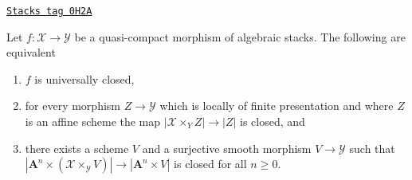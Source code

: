 \begin{lemma}
\label{stacks-limits-lemma-test-universally-closed}
\href{https://stacks.math.columbia.edu/tag/0H2A}{\texttt{Stacks tag 0H2A}}

Let $f : \mathcal{X} \to \mathcal{Y}$ be a quasi-compact morphism of
algebraic stacks. The following are equivalent
\begin{enumerate}
\item $f$ is universally closed,
\item for every morphism $Z \to \mathcal{Y}$ which is locally of finite
presentation and where $Z$ is an affine scheme
the map $|\mathcal{X} \times_Y Z| \to |Z|$ is closed, and
\item there exists a scheme $V$ and a surjective smooth morphism
$V \to \mathcal{Y}$ such that
$|\mathbf{A}^n \times (\mathcal{X} \times_\mathcal{Y} V)|
\to |\mathbf{A}^n \times V|$ is closed for all $n \geq 0$.
\end{enumerate}
\end{lemma}

